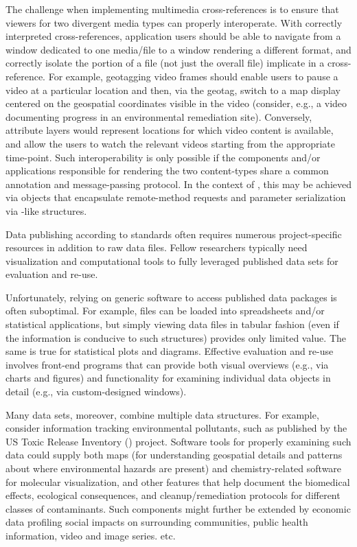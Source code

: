 \documentclass[11pt]{article}
\begin{document}
{{\begin{description}
\pseudoIndent{}  The challenge when implementing multimedia cross-references is to 
ensure that viewers for two divergent media types can properly 
interoperate.  With correctly interpreted cross-references, application users should be able 
to navigate from a window dedicated to one media/file to a 
window rendering a different format, and correctly isolate the 
portion of a file (not just the overall file) implicate in a cross-reference.  
For example, geotagging video frames should enable users to pause a video 
at a particular location and then, via the geotag, switch to a map 
display centered on the geospatial coordinates visible in the video 
(consider, e.g., a video documenting progress in an environmental 
remediation site).  Conversely, \GIS{} attribute layers would represent 
locations for which video content is available, and allow the users 
to watch the relevant videos starting from the appropriate time-point.  
Such interoperability is only possible if the components and/or applications 
responsible for rendering the two content-types share a common 
annotation and message-passing protocol.  In the context of \PacTk{}, 
this may be achieved via \TSOM{}  objects that encapsulate 
remote-method requests and parameter serialization via 
\TagML{}-like structures.
 

\item[Science and Humanities GUIs]   Data publishing 
according to \FAIRsharing{} standards often requires 
numerous project-specific resources in addition 
to raw data files.  Fellow researchers typically 
need visualization and computational tools to 
fully leveraged published data sets for 
evaluation and re-use.

\pseudoIndent{}  Unfortunately, relying on generic 
software to access published data packages is often 
suboptimal.  For example, \CSV{} files can be 
loaded into spreadsheets and/or statistical applications, 
but simply viewing data files in tabular fashion 
(even if the information is conducive to such structures) 
provides only limited value.  The same is true for 
statistical plots and diagrams.  Effective evaluation 
and re-use involves front-end programs that can provide 
both visual overviews (e.g., via charts and figures) 
and functionality for examining individual data objects 
in detail (e.g., via custom-designed \GUI{} windows).

\pseudoIndent{}  Many data sets, moreover, combine multiple 
data structures.  For example, consider information 
tracking environmental pollutants, such as published 
by the US \EPA{} Toxic Release Inventory (\TRI{}) project.
Software tools for properly examining such data could 
supply both \GIS{} maps (for understanding 
geospatial details and patterns about where environmental 
hazards are present) and chemistry-related software 
for molecular visualization, and other features that 
help document the biomedical effects, ecological 
consequences, and cleanup/remediation protocols for 
different classes of contaminants.  Such components 
might further be extended by economic data 
profiling social impacts on surrounding communities, 
public health information, video and image series. etc.


\end{description}}}
\end{document}
